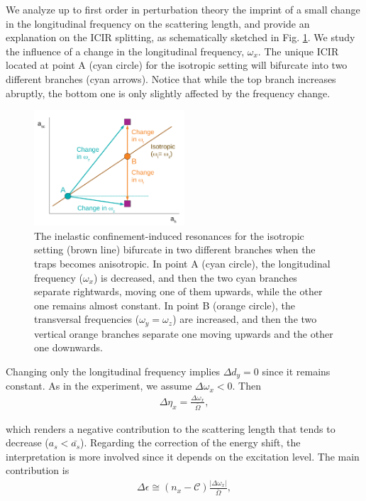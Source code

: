 \documentclass[aps,pre,twocolumn,superscriptaddress,showpacs]{revtex4-1}
\begin{document}
We analyze up to first order in perturbation theory the imprint of a small change in the longitudinal frequency on the scattering length, and provide an explanation on the ICIR splitting, as schematically sketched in Fig. \ref{fig:ICIR scheme}. We study the influence of a change in the longitudinal frequency, $\omega_x$. The unique ICIR located at point A (cyan circle) for the isotropic setting will bifurcate into two different branches (cyan arrows). Notice that while the top branch increases abruptly, the bottom one is only slightly affected by the frequency change.

\begin{figure}[htbp!]
\centering
\includegraphics[width=0.5\textwidth]{ICIR_scheme_Perturb}
\caption{The inelastic confinement-induced resonances for the isotropic setting (brown line) bifurcate in two different branches when the traps becomes anisotropic. In point A (cyan circle), the longitudinal frequency ($\omega_x$) is decreased, and then the two cyan branches separate rightwards, moving one of them upwards, while the other one remains almost constant. In point B (orange circle), the transversal frequencies ($\omega_y = \omega_z$) are increased, and then the two vertical orange branches separate one moving upwards and the other one downwards.}
\label{fig:ICIR scheme}
\end{figure}

Changing only the longitudinal frequency implies $\Delta d_y = 0$ since it remains constant. As in the experiment, we assume $\Delta \omega_x < 0$. Then
\begin{eqnarray}
\Delta \eta_x = \frac{\Delta \omega_x}{\bar{\Omega}},
\label{eq:Delta eta_x perturbed}
\end{eqnarray}

which renders a negative contribution to the scattering length that tends to decrease ($a_s < \bar{a_s}$). Regarding the correction of the energy shift, the interpretation is more involved since it depends on the excitation level. The main contribution is
\begin{eqnarray}
\Delta \epsilon \cong (n_x - \mathcal{C}) \frac{|\Delta \omega_x|}{\bar{\Omega}},
\label{eq:Delta shift perturbed}
\end{eqnarray}
\end{document}
